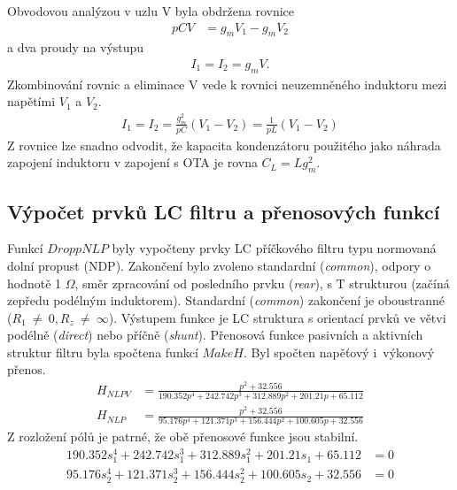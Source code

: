 Obvodovou analýzou v uzlu V byla obdržena rovnice
\begin{align}
pCV &= g_mV_1 - g_mV_2
\end{align}
a dva proudy na výstupu
\begin{align}
I_1 = I_2 = g_mV.
\end{align}
Zkombinování rovnic a eliminace V vede k rovnici neuzemněného induktoru mezi napětími $V_1$ a $V_2$.
\begin{align}
I_1 = I_2 = \frac{g_m^2}{pC}(V_1 - V_2) = \frac{1}{pL}(V_1 - V_2)
\end{align}
Z rovnice lze snadno odvodit, že kapacita kondenzátoru použitého jako náhrada zapojení induktoru v zapojení s OTA je rovna $C_L = L g_m ^2$. \\
\subsection{Výpočet prvků LC filtru a přenosových funkcí}\label{s:VYP}
\noindent Funkcí $DroppNLP$ byly vypočteny prvky LC příčkového filtru typu normovaná dolní propust (NDP). Zakončení bylo zvoleno standardní (\textit{common}), odpory o hodnotě 1 $\Omega$, směr zpracování od posledního prvku (\textit{rear}), s T strukturou (začíná zepředu podélným induktorem). Standardní (\textit{common}) zakončení je oboustranné ($R_1~\neq~0, R_z~\neq~\infty$). Výstupem funkce je LC struktura s orientací prvků ve větvi podélně (\textit{direct}) nebo příčně (\textit{shunt}).
\noindent Přenosová funkce pasivních a aktivních struktur filtru byla spočtena funkcí $MakeH$. Byl spočten  napěťový i~výkonový přenos.
\begin{align}
H_{NLPV} &= \frac{p^2  + 32.556}{190.352p^4  + 242.742p^3  + 312.889p^2  + 201.21p + 65.112}\\
H_{NLP} &= \frac{p^2  + 32.556}{95.176p^4 + 121.371p^3 + 156.444p^2 + 100.605p + 32.556}
\end{align}
\noindent Z rozložení pólů je patrné, že obě přenosové funkce jsou stabilní.
\begin{align}
190.352s_1^4 + 242.742s_1^3 + 312.889s_1^2 + 201.21s_1 + 65.112 &= 0 \\
95.176s_2^4 + 121.371s_2^3 + 156.444s_2^2 + 100.605s_2 + 32.556 &= 0
\end{align}
